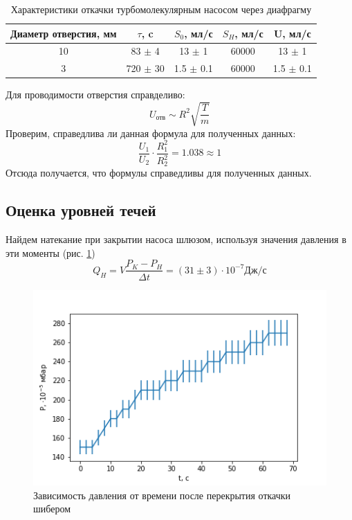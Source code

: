 \documentclass[a4paper,12pt]{article} %
\begin{document}
\begin{table}
\caption{Характеристики откачки турбомолекулярным насосом через диафрагму}
\label{диафрагма+табл}
\begin{tabular}{|c|c|c|c|c|}
\hline 
Диаметр отверстия, мм&$\tau$, c & $S_0$, мл/с& $S_H$, мл/с& U, мл/с  \\ 
\hline 
10 & 83 $\pm$ 4 & 13 $\pm$ 1 & 60000 & 13 $\pm$ 1\\ 
\hline 
3 & 720 $\pm$ 30 & 1.5 $\pm$ 0.1 & 60000 & 1.5 $\pm$ 0.1\\ 
\hline
\end{tabular} 
\end{table}

Для проводимости отверстия справделиво:
\begin{equation}
U_{\text{отв}} \sim R^2 \sqrt{\frac{T}{m}}
\end{equation}
Проверим, справедлива ли данная формула для полученных данных:
\begin{equation}
\frac{U_1}{U_2}\cdot \frac{R_1^2}{R_2^2} =1.038\approx 1
\end{equation}
Отсюда получается, что формулы справедливы для полученных данных.


\subsection{Оценка уровней течей}

Найдем натекание при закрытии насоса шлюзом, используя значения давления в эти моменты (рис. \ref{течи})
\begin{equation}
Q_H = V\frac{P_K-P_H}{\Delta t} = (31 \pm 3) \cdot 10^{-7} \text{Дж/с}
\end{equation}


\begin{figure}[h!]
\begin{center}
\includegraphics[width=\textwidth]{Течи.png}
\end{center}
\caption{Зависимость давления от времени после перекрытия откачки шибером} \label{течи}
\end{figure}
\end{document}

